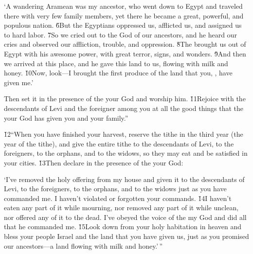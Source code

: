 \begin{poetry}
\poeml `A wandering Aramean was my ancestor, who went down to Egypt and traveled there with very few family members, yet there he became a great, powerful, and populous nation. \v{6}But the Egyptians oppressed us, afflicted us, and assigned us to hard labor. \v{7}So we cried out to the  God of our ancestors, and he heard our cries and observed our affliction, trouble, and oppression. \v{8}The  brought us out of Egypt with his awesome power, with great terror, signs, and wonders. \v{9}And then we arrived at this place, and he gave this land to us, flowing with milk and honey. \v{10}Now, look---I brought the first produce of the land that you, , have given me.'
\end{poetry}

Then set it in the presence of the  your God and worship him. \v{11}Rejoice with the descendants of Levi and the foreigner among you at all the good things that the  your God has given you and your family.''

\v{12}``When you have finished your harvest, reserve the tithe in the third year (the year of the tithe), and give the entire tithe to the descendants of Levi, to the foreigners, to the orphans, and to the widows, so they may eat and be satisfied in your cities. \v{13}Then declare in the presence of the  your God:

\begin{poetry}
\poeml `I've removed the holy offering from my house and given it to the descendants of Levi, to the foreigners, to the orphans, and to the widows just as you have commanded me. I haven't violated or forgotten your commands. \v{14}I haven't eaten any part of it while mourning, nor removed any part of it while unclean, nor offered any of it to the dead. I've obeyed the voice of the  my God and did all that he commanded me. \v{15}Look down from your holy habitation in heaven and bless your people Israel and the land that you have given us, just as you promised our ancestors---a land flowing with milk and honey.'\,''
\end{poetry}

